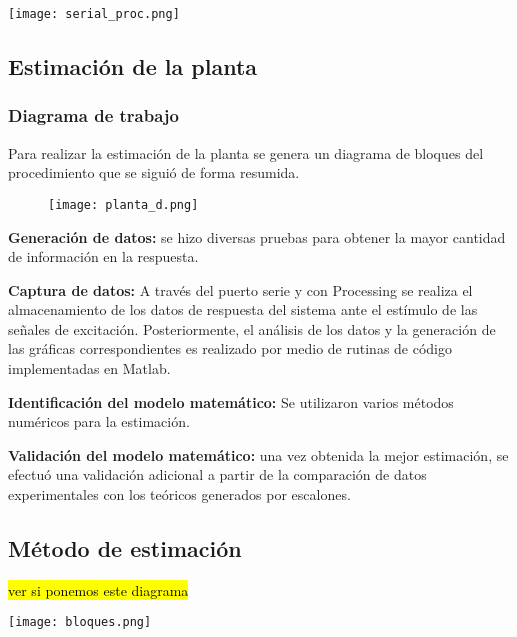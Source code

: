\begin{center}
    \texttt{[image: serial\_proc.png]}
    \label{fig:Proce}    
\end{center}

\subsection{Estimación de la planta}
    \subsubsection{Diagrama de trabajo}

Para realizar la estimación de la planta se genera un diagrama de bloques del procedimiento que se siguió de forma resumida.

\begin{figure}[htb]
	\centering
	\texttt{[image: planta\_d.png]}
	\label{fig:planta_d}
\end{figure}

 \textbf{Generación de datos:}  se hizo diversas pruebas para obtener la mayor cantidad de información en la respuesta.

 \textbf{Captura de datos:} A través del puerto serie y con Processing se realiza el almacenamiento de los datos de respuesta del sistema ante el estímulo de las señales de excitación. Posteriormente, el análisis de los datos y la generación de las gráficas correspondientes es realizado por medio de rutinas de código implementadas en Matlab.

 \textbf{Identificación del modelo matemático:} Se utilizaron varios métodos numéricos para la estimación.

 \textbf{Validación del modelo matemático:} una vez obtenida la mejor estimación, se efectuó una validación adicional a partir de la comparación de datos experimentales con los teóricos generados por escalones.






    \subsection{Método de estimación}
\hl{ver si ponemos este diagrama}
    \begin{center}
        \texttt{[image: bloques.png]}
        \label{fig:bloques}    
    \end{center}
       

